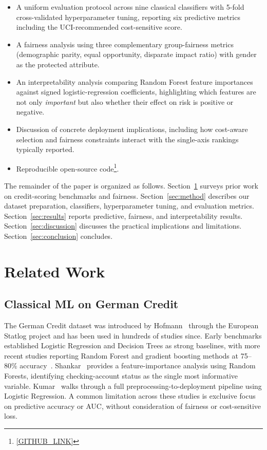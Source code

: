 \documentclass[conference]{IEEEtran}
\begin{document}
\begin{itemize}
    \item A uniform evaluation protocol across nine classical classifiers with 5-fold cross-validated hyperparameter tuning, reporting six predictive metrics including the UCI-recommended cost-sensitive score.
    \item A fairness analysis using three complementary group-fairness metrics (demographic parity, equal opportunity, disparate impact ratio) with gender as the protected attribute.
    \item An interpretability analysis comparing Random Forest feature importances against signed logistic-regression coefficients, highlighting which features are not only \emph{important} but also whether their effect on risk is positive or negative.
    \item Discussion of concrete deployment implications, including how cost-aware selection and fairness constraints interact with the single-axis rankings typically reported.
    \item Reproducible open-source code\footnote{\url{[GITHUB_LINK]}}.
\end{itemize}

The remainder of the paper is organized as follows. Section~\ref{sec:related} surveys prior work on credit-scoring benchmarks and fairness. Section~\ref{sec:method} describes our dataset preparation, classifiers, hyperparameter tuning, and evaluation metrics. Section~\ref{sec:results} reports predictive, fairness, and interpretability results. Section~\ref{sec:discussion} discusses the practical implications and limitations. Section~\ref{sec:conclusion} concludes.

\section{Related Work}\label{sec:related}

\subsection{Classical ML on German Credit}
The German Credit dataset was introduced by Hofmann~\cite{hofmann1994german} through the European Statlog project and has been used in hundreds of studies since. Early benchmarks established Logistic Regression and Decision Trees as strong baselines, with more recent studies reporting Random Forest and gradient boosting methods at 75--80\% accuracy~\cite{creditworthiness2025}. Shankar~\cite{shankar_rf_german} provides a feature-importance analysis using Random Forests, identifying checking-account status as the single most informative variable. Kumar~\cite{kumar_medium_german} walks through a full preprocessing-to-deployment pipeline using Logistic Regression. A common limitation across these studies is exclusive focus on predictive accuracy or AUC, without consideration of fairness or cost-sensitive loss.
\end{document}
